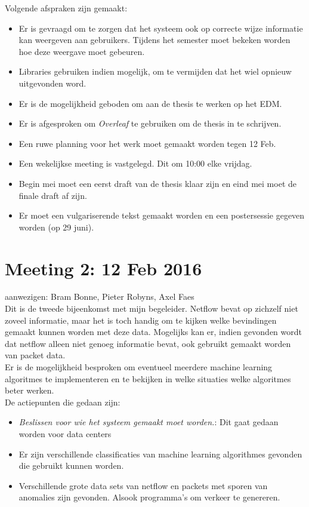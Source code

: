 \noindent Volgende afspraken zijn gemaakt:
\begin{itemize}  
		\item Er is gevraagd om te zorgen dat het systeem ook op correcte wijze informatie kan weergeven aan gebruikers. Tijdens het semester moet bekeken worden hoe deze weergave moet gebeuren.
        \item Libraries gebruiken indien mogelijk, om te vermijden dat het wiel opnieuw uitgevonden word.
        \item Er is de mogelijkheid geboden om aan de thesis te werken op het EDM.
        \item Er is afgesproken om \textit{Overleaf} te gebruiken om de thesis in te schrijven.
        \item Een ruwe planning voor het werk moet gemaakt worden tegen 12 Feb.
        \item Een wekelijkse meeting is vastgelegd. Dit om 10:00 elke vrijdag.
        \item Begin mei moet een eerst draft van de thesis klaar zijn en eind mei moet de finale draft af zijn. 
        \item Er moet een vulgariserende tekst gemaakt worden en een postersessie gegeven worden (op 29 juni).
\end{itemize}
\section{Meeting 2: 12 Feb 2016}
aanwezigen: Bram Bonne, Pieter Robyns, Axel Faes\\

\noindent Dit is de tweede bijeenkomst met mijn begeleider. Netflow bevat op zichzelf niet zoveel informatie, maar het is toch handig om te kijken welke bevindingen gemaakt kunnen worden met deze data. Mogelijks kan er, indien gevonden wordt dat netflow alleen niet genoeg informatie bevat, ook gebruikt gemaakt worden van packet data. \\

\noindent Er is de mogelijkheid besproken om eventueel meerdere machine learning algoritmes te implementeren en te bekijken in welke situaties welke algoritmes beter werken.\\

\noindent De actiepunten die gedaan zijn:
\begin{itemize}  
        \item \textit{Beslissen voor wie het systeem gemaakt moet worden.}: Dit gaat gedaan worden voor data centers
        \item Er zijn verschillende classificaties van machine learning algorithmes gevonden die gebruikt kunnen worden.
        \item Verschillende grote data sets van netflow en packets met sporen van anomalies zijn gevonden. Alsook programma's om verkeer te genereren.
\end{itemize}

